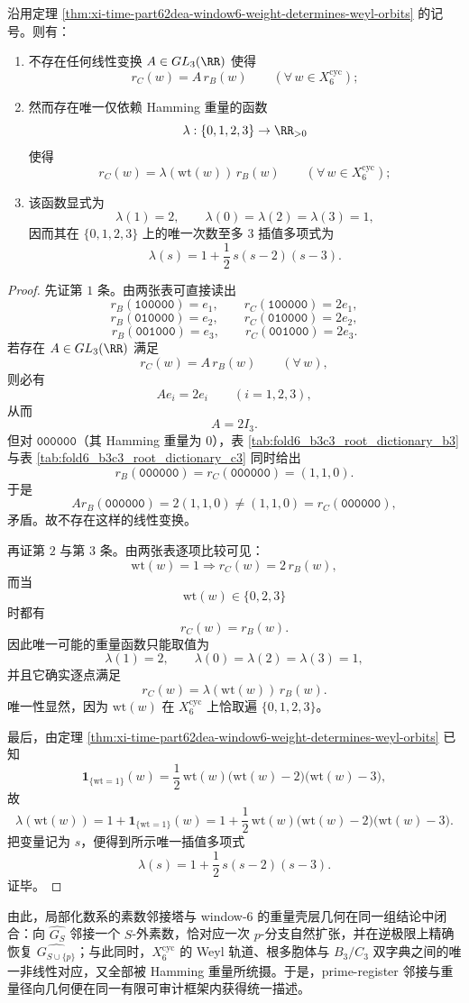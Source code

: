 \begin{theorem}\label{thm:xi-time-part62dea-window6-b3c3-unique-radial-weight-scaling}
沿用定理 \ref{thm:xi-time-part62dea-window6-weight-determines-weyl-orbits} 的记号。则有：
\begin{enumerate}
  \item 不存在任何线性变换 \(A\in GL_3(\RR)\) 使得
  \[
  r_C(w)=A\,r_B(w)
  \qquad(\forall\,w\in X_6^{\mathrm{cyc}});
  \]
  \item 然而存在唯一仅依赖 Hamming 重量的函数
  \[
  \lambda:\{0,1,2,3\}\to \RR_{>0}
  \]
  使得
  \[
  r_C(w)=\lambda(\mathrm{wt}(w))\,r_B(w)
  \qquad(\forall\,w\in X_6^{\mathrm{cyc}});
  \]
  \item 该函数显式为
  \[
  \lambda(1)=2,
  \qquad
  \lambda(0)=\lambda(2)=\lambda(3)=1,
  \]
  因而其在 \(\{0,1,2,3\}\) 上的唯一次数至多 \(3\) 插值多项式为
  \[
  \lambda(s)=1+\frac12\,s(s-2)(s-3).
  \]
\end{enumerate}
\end{theorem}
\begin{proof}
先证第 \(1\) 条。由两张表可直接读出
\[
r_B(\texttt{100000})=e_1,\qquad r_C(\texttt{100000})=2e_1,
\]
\[
r_B(\texttt{010000})=e_2,\qquad r_C(\texttt{010000})=2e_2,
\]
\[
r_B(\texttt{001000})=e_3,\qquad r_C(\texttt{001000})=2e_3.
\]
若存在 \(A\in GL_3(\RR)\) 满足
\[
r_C(w)=A\,r_B(w)\qquad(\forall\,w),
\]
则必有
\[
Ae_i=2e_i\qquad(i=1,2,3),
\]
从而
\[
A=2I_3.
\]
但对 \(\texttt{000000}\)（其 Hamming 重量为 \(0\)），表 \ref{tab:fold6_b3c3_root_dictionary_b3} 与表 \ref{tab:fold6_b3c3_root_dictionary_c3} 同时给出
\[
r_B(\texttt{000000})=r_C(\texttt{000000})=(1,1,0).
\]
于是
\[
Ar_B(\texttt{000000})
=
2(1,1,0)
\neq
(1,1,0)
=
r_C(\texttt{000000}),
\]
矛盾。故不存在这样的线性变换。

再证第 \(2\) 与第 \(3\) 条。由两张表逐项比较可见：
\[
\mathrm{wt}(w)=1\Longrightarrow r_C(w)=2\,r_B(w),
\]
而当
\[
\mathrm{wt}(w)\in\{0,2,3\}
\]
时都有
\[
r_C(w)=r_B(w).
\]
因此唯一可能的重量函数只能取值为
\[
\lambda(1)=2,
\qquad
\lambda(0)=\lambda(2)=\lambda(3)=1,
\]
并且它确实逐点满足
\[
r_C(w)=\lambda(\mathrm{wt}(w))\,r_B(w).
\]
唯一性显然，因为 \(\mathrm{wt}(w)\) 在 \(X_6^{\mathrm{cyc}}\) 上恰取遍 \(\{0,1,2,3\}\)。

最后，由定理 \ref{thm:xi-time-part62dea-window6-weight-determines-weyl-orbits} 已知
\[
\mathbf 1_{\{\mathrm{wt}=1\}}(w)
=
\frac12\,\mathrm{wt}(w)\bigl(\mathrm{wt}(w)-2\bigr)\bigl(\mathrm{wt}(w)-3\bigr),
\]
故
\[
\lambda(\mathrm{wt}(w))
=
1+\mathbf 1_{\{\mathrm{wt}=1\}}(w)
=
1+\frac12\,\mathrm{wt}(w)\bigl(\mathrm{wt}(w)-2\bigr)\bigl(\mathrm{wt}(w)-3\bigr).
\]
把变量记为 \(s\)，便得到所示唯一插值多项式
\[
\lambda(s)=1+\frac12\,s(s-2)(s-3).
\]
证毕。
\end{proof}

\noindent
由此，局部化数系的素数邻接塔与 window-\(6\) 的重量壳层几何在同一组结论中闭合：向 \(\widehat{G_S}\) 邻接一个 \(S\)-外素数，恰对应一次 \(p\)-分支自然扩张，并在逆极限上精确恢复 \(\widehat{G_{S\cup\{p\}}}\)；与此同时，\(X_6^{\mathrm{cyc}}\) 的 Weyl 轨道、根多胞体与 \(B_3/C_3\) 双字典之间的唯一非线性对应，又全部被 Hamming 重量所统摄。于是，prime-register 邻接与重量径向几何便在同一有限可审计框架内获得统一描述。

\endinput
